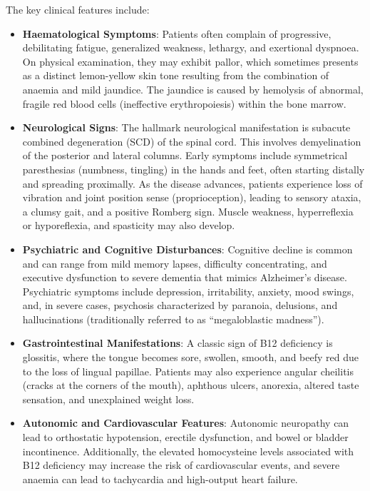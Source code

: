 The key clinical features include:
\begin{itemize}
    \item \textbf{Haematological Symptoms}: Patients often complain of progressive, debilitating fatigue, generalized weakness, lethargy, and exertional dyspnoea. On physical examination, they may exhibit pallor, which sometimes presents as a distinct lemon-yellow skin tone resulting from the combination of anaemia and mild jaundice. The jaundice is caused by hemolysis of abnormal, fragile red blood cells (ineffective erythropoiesis) within the bone marrow.
    \item \textbf{Neurological Signs}: The hallmark neurological manifestation is subacute combined degeneration (SCD) of the spinal cord. This involves demyelination of the posterior and lateral columns. Early symptoms include symmetrical paresthesias (numbness, tingling) in the hands and feet, often starting distally and spreading proximally. As the disease advances, patients experience loss of vibration and joint position sense (proprioception), leading to sensory ataxia, a clumsy gait, and a positive Romberg sign. Muscle weakness, hyperreflexia or hyporeflexia, and spasticity may also develop.
    \item \textbf{Psychiatric and Cognitive Disturbances}: Cognitive decline is common and can range from mild memory lapses, difficulty concentrating, and executive dysfunction to severe dementia that mimics Alzheimer's disease. Psychiatric symptoms include depression, irritability, anxiety, mood swings, and, in severe cases, psychosis characterized by paranoia, delusions, and hallucinations (traditionally referred to as ``megaloblastic madness'').
    \item \textbf{Gastrointestinal Manifestations}: A classic sign of B12 deficiency is glossitis, where the tongue becomes sore, swollen, smooth, and beefy red due to the loss of lingual papillae. Patients may also experience angular cheilitis (cracks at the corners of the mouth), aphthous ulcers, anorexia, altered taste sensation, and unexplained weight loss.
    \item \textbf{Autonomic and Cardiovascular Features}: Autonomic neuropathy can lead to orthostatic hypotension, erectile dysfunction, and bowel or bladder incontinence. Additionally, the elevated homocysteine levels associated with B12 deficiency may increase the risk of cardiovascular events, and severe anaemia can lead to tachycardia and high-output heart failure.
\end{itemize}

